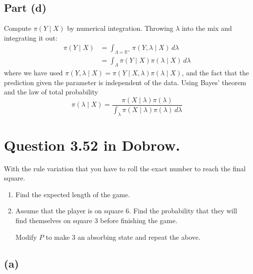 \documentclass{article}
\begin{document}
\subsection{Part (d)}
Compute $\pi(Y \mid X)$ by numerical integration.
Throwing $\lambda$ into the mix and integrating it out:
\begin{align*}
	\pi(Y \mid X) &= \int_{\Lambda = \mathbb R^+} \pi(Y, \lambda \mid X) \, d\lambda \\
	&= \int_\Lambda \pi(Y \mid X) \pi(\lambda \mid X) \, d\lambda
\end{align*}
where we have used $\pi(Y, \lambda \mid X) = \pi(Y \mid X, \lambda) \pi(\lambda \mid X)$,
and the fact that the prediction given the parameter is independent of the data.
Using Bayes' theorem and the law of total probability
$$ \pi(\lambda \mid X) = \frac{\pi(X \mid \lambda) \pi(\lambda)}{\int_\lambda \pi(X \mid \lambda) \pi(\lambda) \, d\lambda} $$

\section{Question \num{3.52} in Dobrow.}
With the rule variation that you have to roll the exact number to reach
the final square.
\begin{enumerate}[label=(\alph*)]
	\item Find the expected length of the game.
	\item Assume that the player is on square 6.
		Find the probability that they will find themselves on square 3 before finishing the game.

		Modify $P$ to make $3$ an absorbing state and repeat the above.
\end{enumerate}

\subsection{(a)}
\end{document}
